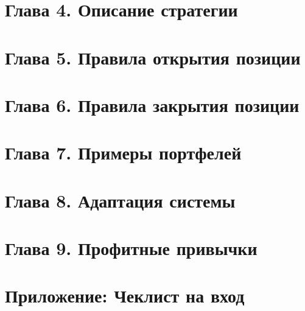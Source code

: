 \documentclass[12pt,DIV=18]{scrartcl}
\begin{document}
\section*{Глава 4. Описание стратегии}
\label{chapter4}

\section*{Глава 5. Правила открытия позиции}
\label{chapter5}

\section*{Глава 6. Правила закрытия позиции}
\label{chapter6}

\section*{Глава 7. Примеры портфелей}
\label{chapter7}

\section*{Глава 8. Адаптация системы}
\label{chapter8}

\section*{Глава 9. Профитные привычки}
\label{chapter9}


\appendix
\section*{Приложение: Чеклист на вход}
\label{appendix}
\end{document}
